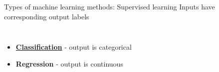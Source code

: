 \documentclass[pdf]{beamer}
\begin{document}
\begin{frame}{Types of machine learning methods: Supervised learning}
\vspace{0.5cm}
Inputs have corresponding output labels
\vspace{-0.5cm}
\begin{columns}
\begin{itemize}\addtolength{\itemsep}{6\baselineskip}
	\item<2-> \textbf{\underline{Classification}} - output is categorical
	\item<3-> \textbf{Regression} - output is continuous
\end{itemize}
\begin{center}
	\vfill

\end{center}
\end{columns}
\end{frame}
\end{document}
